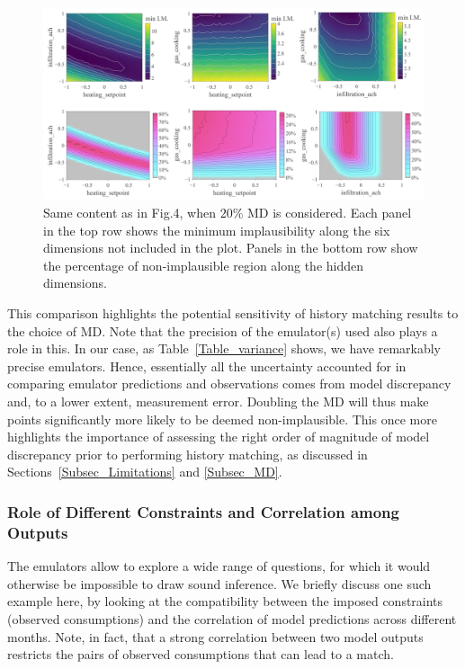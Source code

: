 \documentclass[preprint,12pt, sort&compress]{elsarticle}
\begin{document}
\begin{figure}
\includegraphics[width=\textwidth]{Non-Implausible_Plots/Gas/Fig2}
\caption{Same content as in Fig.4, when $20\%$ MD is considered. Each panel in the top row shows the minimum implausibility along the six dimensions not included in the plot. Panels in the bottom row show the percentage of non-implausible region along the hidden dimensions.}
\label{Fig_NI_gas_20}
\end{figure}

This comparison highlights the potential sensitivity of history matching results to the choice of MD. Note that the precision of the emulator(s) used also plays a role in this. In our case, as Table~\ref{Table_variance} shows, we have remarkably precise emulators. Hence, essentially all the uncertainty accounted for in comparing emulator predictions and observations comes from model discrepancy and, to a lower extent, measurement error. Doubling the MD will thus make points significantly more likely to be deemed non-implausible. This once more highlights the importance of assessing the right order of magnitude of model discrepancy prior to performing history matching, as discussed in Sections~\ref{Subsec_Limitations} and \ref{Subsec_MD}.


\subsubsection{Role of Different Constraints and Correlation among Outputs}

The emulators allow to explore a wide range of questions, for which it would otherwise be impossible to draw sound inference. We briefly discuss one such example here, by looking at the compatibility between the imposed constraints (observed consumptions) and the correlation of model predictions across different months. Note, in fact, that a strong correlation between two model outputs restricts the pairs of observed consumptions that can lead to a match.
\end{document}
